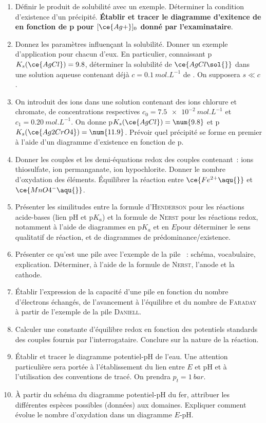 \documentclass[a4paper, 12pt, final, garamond]{book}
\begin{document}
\begin{enumerate}[label=\sqenumi]
    \item Définir le produit de solubilité avec un exemple. Déterminer la
        condition d'existence d'un précipité. \textbf{Établir et tracer le
        diagramme d'exitence de  en fonction de p pour
      $[\ce{Ag+}]_0$ donné par l'examinataire}.

    \item Donnez les paramètres influençant la solubilité. Donner un exemple
      d'application pour chacun d'eux. En particulier, connaissant
      p$K_s(\ce{AgCl}) = 9.8$, déterminer la solubilité de $\ce{AgCl\sol{}}$
      dans une solution aqueuse contenant déjà $c = \SI{0.1}{mol.L^{-1}}$ de
      . On supposera $s \ll c$.

    \item On introduit des ions  dans une solution contenant des ions
      chlorure et chromate, de concentrations respectives $c_0 =
      \SI{7.5e-2}{mol.L^{-1}}$ et $c_1 = \SI{0.20}{mol.L^{-1}}$. On donne
      p$K_s(\ce{AgCl}) = \num{9.8}$ et p$K_s(\ce{Ag2CrO4}) = \num{11.9}$.
      Prévoir quel précipité se forme en premier à l'aide d'un diagramme
      d'existence en fonction de p.
    \item Donner les couples et les demi-équations redox des couples contenant~:
        ions thiosulfate, ion permanganate, ion hypochlorite. Donner le nombre
        d'oxydation des éléments. Équilibrer la réaction entre
        $\ce{Fe^{2+}\aqu{}}$ et $\ce{MnO4^-\aqu{}}$.
    \item Présenter les similitudes entre la formule d'\textsc{Henderson} pour
      les réactions acide-bases (lien pH et p$K_a$) et
        la formule de \textsc{Nerst} pour les réactions redox, notamment à
        l'aide de diagrammes en p$K_a$ et en $E$\textdegree pour déterminer le
        sens qualitatif de réaction, et de diagrammes de prédominance/existence.
    \item Présenter ce qu'est une pile avec l'exemple de la pile
      ~: schéma, vocabulaire, explication. Déterminer, à l'aide
      de la formule de \textsc{Nerst}, l'anode et la cathode.
    \item Établir l'expression de la capacité d'une pile en fonction du nombre
        d'électrons échangés, de l'avancement à l'équilibre et du nombre de
        \textsc{Faraday} à partir de l'exemple de la pile \textsc{Daniell}.
    \item Calculer une constante d'équilibre redox en fonction des potentiels
      standards des couples fournis par l'interrogataire. Conclure sur la nature
      de la réaction.
    \item Établir et tracer le diagramme potentiel-pH de l'eau. Une attention
      particulière sera portée à l'établissement du lien entre $E$ et pH et à
      l'utilisation des conventions de tracé. On prendra $p_t = \SI{1}{bar}$.
    \item À partir du schéma du diagramme potentiel-pH du fer, attribuer les
      différentes espèces possibles (données) aux domaines. Expliquer comment
      évolue le nombre d'oxydation dans un diagramme $E$-pH.
\end{enumerate}
\end{document}
